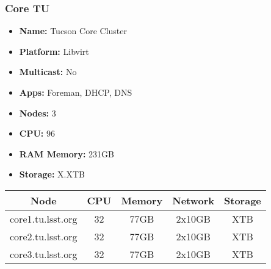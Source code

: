 \subsubsection{Core TU}
\vspace*{-\baselineskip}
\begin{itemize}
  \itemsep0em 
  \item \textbf{Name:}       Tucson Core Cluster
  \item \textbf{Platform:}   Libvirt
  \item \textbf{Multicast:}  No
  \item \textbf{Apps:}       Foreman, DHCP, DNS
  \item \textbf{Nodes:}      3
  \item \textbf{CPU:}        96
  \item \textbf{RAM Memory:} 231GB
  \item \textbf{Storage:} X.XTB
\end{itemize}
\vspace*{-\baselineskip}
\begin{center}
  \small
  \begin{tabular}{||c c c c c||}
    \hline
    \textbf{Node} & \textbf{CPU} & \textbf{Memory} & \textbf{Network} & \textbf{Storage} \\ [0.5ex]
    \hline
    core1.tu.lsst.org & 32 & 77GB & 2x10GB & XTB \\
    \hline
    core2.tu.lsst.org & 32 & 77GB & 2x10GB & XTB \\
    \hline
    core3.tu.lsst.org & 32 & 77GB & 2x10GB & XTB \\
    \hline
  \end{tabular}
\end{center}